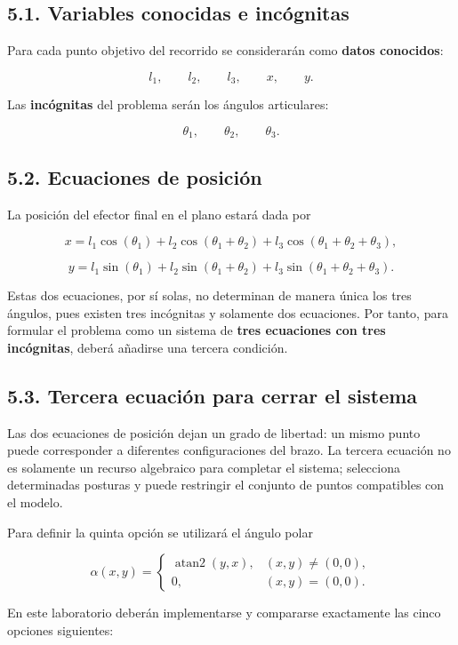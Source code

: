 \documentclass[12pt]{article}
\begin{document}
\subsection*{5.1. Variables conocidas e incógnitas}

Para cada punto objetivo del recorrido se considerarán como \textbf{datos conocidos}:

\[
l_1,\qquad l_2,\qquad l_3,\qquad x,\qquad y.
\]

Las \textbf{incógnitas} del problema serán los ángulos articulares:

\[
\theta_1,\qquad \theta_2,\qquad \theta_3.
\]

\subsection*{5.2. Ecuaciones de posición}

La posición del efector final en el plano estará dada por

\[
x=l_1\cos(\theta_1)+l_2\cos(\theta_1+\theta_2)+l_3\cos(\theta_1+\theta_2+\theta_3),
\]

\[
y=l_1\sin(\theta_1)+l_2\sin(\theta_1+\theta_2)+l_3\sin(\theta_1+\theta_2+\theta_3).
\]

Estas dos ecuaciones, por sí solas, no determinan de manera única los tres ángulos, pues existen tres incógnitas y solamente dos ecuaciones. Por tanto, para formular el problema como un sistema de \textbf{tres ecuaciones con tres incógnitas}, deberá añadirse una tercera condición.

\subsection*{5.3. Tercera ecuación para cerrar el sistema}

Las dos ecuaciones de posición dejan un grado de libertad: un mismo punto puede corresponder a diferentes configuraciones del brazo. La tercera ecuación no es solamente un recurso algebraico para completar el sistema; selecciona determinadas posturas y puede restringir el conjunto de puntos compatibles con el modelo.

Para definir la quinta opción se utilizará el ángulo polar

\[
\alpha(x,y)=
\begin{cases}
\operatorname{atan2}(y,x), & (x,y)\neq(0,0),\\[0.3em]
0, & (x,y)=(0,0).
\end{cases}
\]

En este laboratorio deberán implementarse y compararse exactamente las cinco opciones siguientes:
\end{document}
